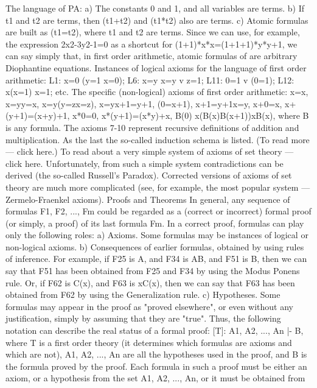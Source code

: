 The language of PA:
a) The constants 0 and 1, and all variables are terms.
b) If t1 and t2 are terms, then (t1+t2) and (t1*t2) also are terms.
c) Atomic formulas are built as (t1=t2), where t1 and t2 are terms.
Since we can use, for example, the expression 2x2-3y2-1=0 as a shortcut for (1+1)*x*x=(1+1+1)*y*y+1, we can say simply
that, in first order arithmetic, atomic formulas of are arbitrary Diophantine equations.
Instances of logical axioms for the language of first order arithmetic:
L1: x=0 \IMPLIES  (y=1 \IMPLIES  x=0);
L6: x=y \IMPLIES  x=y v z=1;
L11: 0=1 v \neg (0=1);
L12: \forall x(x=1) \IMPLIES  x=1;
etc.
The specific (non-logical) axioms of first order arithmetic:
x=x,
x=y\IMPLIES y=x,
x=y\IMPLIES (y=z\IMPLIES x=z),
x=y\IMPLIES x+1=y+1,
\neg (0=x+1),
x+1=y+1\IMPLIES x=y,
x+0=x,
x+(y+1)=(x+y)+1,
x*0=0,
x*(y+1)=(x*y)+x,
B(0) \AND  \forall x(B(x)\IMPLIES B(x+1))\IMPLIES \forall xB(x), where B is any formula.
The axioms 7-10 represent recursive definitions of addition and multiplication. As the last the so-called induction schema is
listed. (To read more --- click here.)
To read about a very simple system of axioms of set theory --- click here. Unfortunately, from such a simple system
contradictions can be derived (the so-called Russell's Paradox). Corrected versions of axioms of set theory are much more
complicated (see, for example, the most popular system --- Zermelo-Fraenkel axioms).
Proofs and Theorems
In general, any sequence of formulas F1, F2, ..., Fm could be regarded as a (correct or incorrect) formal
proof (or simply, a proof) of its last formula Fm. In a correct proof, formulas can play only the following
roles:
a) Axioms. Some formulas may be instances of logical or non-logical axioms.
b) Consequences of earlier formulas, obtained by using rules of inference. For example, if F25 is A, and
F34 is A\IMPLIES B, and F51 is B, then we can say that F51 has been obtained from F25 and F34 by using the
Modus Ponens rule. Or, if F62 is C(x), and F63 is \forall xC(x), then we can say that F63 has been obtained
from F62 by using the Generalization rule.
c) Hypotheses. Some formulas may appear in the proof as "proved elsewhere", or even without any
justification, simply by assuming that they are "true".
Thus, the following notation can describe the real status of a formal proof:
[T]: A1, A2, ..., An |- B,
where T is a first order theory (it determines which formulas are axioms and which are not), A1, A2, ..., An
are all the hypotheses used in the proof, and B is the formula proved by the proof. Each formula in such a
proof must be either an axiom, or a hypothesis from the set A1, A2, ..., An, or it must be obtained from
